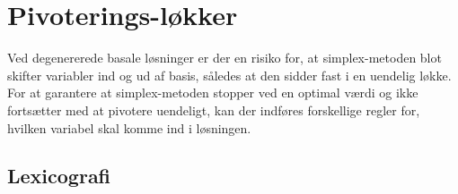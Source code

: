 \section{Pivoterings-løkker}
Ved degenererede basale løsninger er der en risiko for, at simplex-metoden blot skifter variabler ind og ud af basis, således at den sidder fast i en uendelig løkke.  
For at garantere at simplex-metoden stopper ved en optimal værdi og ikke fortsætter med at pivotere uendeligt, kan der indføres forskellige regler for, hvilken variabel skal komme ind i løsningen.

\subsection{Lexicografi}

